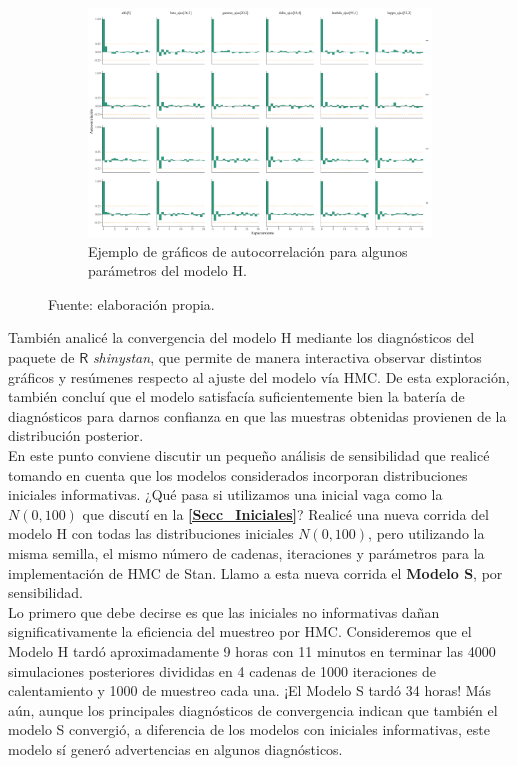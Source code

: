 \begin{figure}
\begin{subfigure}{0.6\textwidth}
	\includegraphics[width = \textwidth]{Figs/Convergencia/Convergencia_AutoCorr}
	\caption{Ejemplo de gráficos de autocorrelación para algunos parámetros del modelo H.}
	\label{fig:Autocorr_H}
	\end{subfigure}
	\caption{Fuente: elaboración propia.}
\end{figure}

 También analicé la convergencia del modelo H mediante los diagnósticos del paquete de $\mathsf{R}$ \textit{shinystan}, que permite de manera interactiva observar distintos gráficos y resúmenes respecto al ajuste del modelo vía HMC. De esta exploración, también concluí que el modelo satisfacía suficientemente bien la batería de diagnósticos para darnos confianza en que las muestras obtenidas provienen de la distribución posterior.\\
 
 En este punto conviene discutir un pequeño análisis de sensibilidad que realicé tomando en cuenta que los modelos considerados incorporan distribuciones iniciales informativas. ¿Qué pasa si utilizamos una inicial vaga como la $N(0,100)$ que discutí en la \textbf{\autoref{Secc_Iniciales}}? Realicé una nueva corrida del modelo H con todas las distribuciones iniciales $N(0,100)$, pero utilizando la misma semilla, el mismo número de cadenas, iteraciones y parámetros para la implementación de HMC de Stan. Llamo a esta nueva corrida el \textbf{Modelo S}, por sensibilidad.\\
  
 Lo primero que debe decirse es que las iniciales no informativas dañan significativamente la eficiencia del muestreo por HMC. Consideremos que el Modelo H tardó aproximadamente 9 horas con 11 minutos en terminar las 4000 simulaciones posteriores divididas en 4 cadenas de 1000 iteraciones de calentamiento y 1000 de muestreo cada una. ¡El Modelo S tardó 34 horas! Más aún, aunque los principales diagnósticos de convergencia indican que también el modelo S convergió, a diferencia de los modelos con iniciales informativas, este modelo sí generó advertencias en algunos diagnósticos.\\
 
